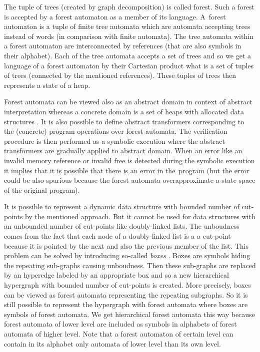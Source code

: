 \documentclass[fleqn,11pt]{ExcelAtFIT} %
\begin{document}
The tuple of trees (created by graph decomposition) is called forest.
Such a forest is accepted by a forest automaton as a member of its language.
A~forest automaton is a tuple of finite tree automata which are automata accepting trees instead of words (in comparison with finite automata).
The tree automata within a forest automaton are interconnected by references (that are also symbols in their alphabet).
Each of the tree automata accepts a set of trees and so we get a language of a forest
automaton by their Cartesian product what is a set of tuples of trees (connected by the mentioned references).
These tuples of trees then represents a state of a heap. %

Forest automata can be viewed also as an abstract domain in context of abstract interpretation
whereas a concrete domain is a set of heaps with allocated data structures \cite{atva13}.
It is also possible to define abstract transformers corresponding to the (concrete) program operations over forest automata.
The verification procedure is then performed as a symbolic execution
where the abstract transformers are gradually applied to abstract domain.
When an error like an invalid memory reference or invalid free is detected during the symbolic
execution it implies that it is possible that there is an error in the~program (but the error could be also spurious because
the forest automata overapproximate a state space of the original program).

It is possible to represent a dynamic data structure with bounded number of cut-points by the mentioned approach.
But it cannot be used for data structures with an unbounded number of cut-points like doubly-linked lists.
The unboudness comes from the fact that each node of a doubly-linked list is a a cut-point because
it is pointed by the next and also the previous member of the list.
This problem can be solved by introducing so-called \emph{boxes} \cite{forester13}.
Boxes are symbols hiding the repeating sub-graphs causing unboudness.
Then these sub-graphs are replaced by an hyperedge labeled by an appropriate box
and so a new hierarchical hypergraph with bounded number of cut-points is created.
More precisely, boxes can be viewed as forest automata representing the repeating subgraphs.
So it is still possible to represent the hypergraph with forest automata where
boxes are symbols of forest automata.
We get hierarchical forest automata this way because forest automata of lower level
are included as symbols in alphabets of forest automata of higher level.
Note that a forest automaton of certain level can contain in its alphabet only automata of lower level than its own level.
\end{document}
